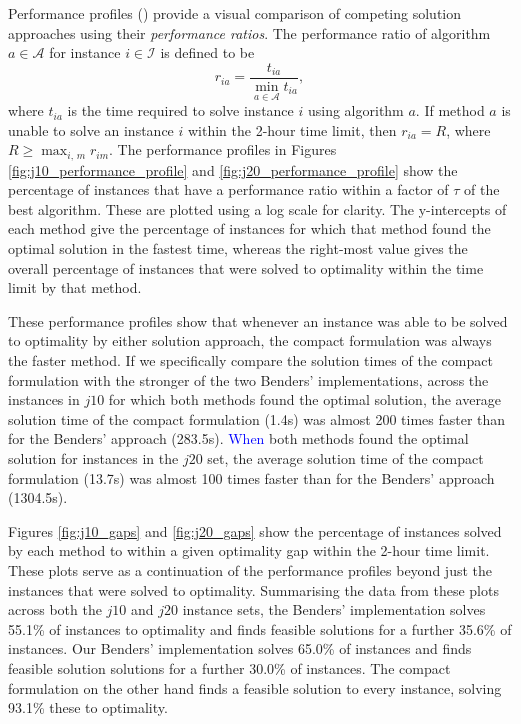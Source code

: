 \documentclass[a4paper,abstracton]{scrartcl}
\newcommand{\marc}[1]{\textcolor{blue}{#1}}
\begin{document}
Performance profiles (\cite{dolan2002benchmarking}) provide a visual comparison of competing solution approaches using their \textit{performance ratios}. The performance ratio of algorithm $a\in \mathcal{A}$ for instance $i\in \mathcal{I}$ is defined to be 
$$r_{ia}=\frac{t_{ia}}{\min_{a\in \mathcal{A}} t_{ia}},$$
where $t_{ia}$ is the time required to solve instance $i$ using algorithm $a$. If method $a$ is unable to solve an instance $i$ within the 2-hour time limit, then $r_{ia}=R$, where $R\geq \max_{i,\,m}r_{im}$. The performance profiles in Figures \ref{fig:j10_performance_profile} and \ref{fig:j20_performance_profile} show the percentage of instances that have a performance ratio within a factor of $\tau$ of the best algorithm. These are plotted using a log scale for clarity. The y-intercepts of each method give the percentage of instances for which that method found the optimal solution in the fastest time, whereas the right-most value gives the overall percentage of instances that were solved to optimality within the time limit by that method.

These performance profiles show that whenever an instance was able to be solved to optimality by either solution approach, the compact formulation was always the faster method. If we specifically compare the solution times of the compact formulation with the stronger of the two Benders' implementations, across the instances in $j10$ for which both methods found the optimal solution, the average solution time of the compact formulation (1.4s) was almost 200 times faster than for the Benders' approach (283.5s). 
\marc{When} both methods found the optimal solution for instances in the $j20$ set, the average solution time of the compact formulation (13.7s) was almost 100 times faster than for the Benders' approach (1304.5s). 

Figures \ref{fig:j10_gaps} and \ref{fig:j20_gaps} show the percentage of instances solved by each method to within a given optimality gap within the 2-hour time limit. These plots serve as a continuation of the performance profiles beyond just the instances that were solved to optimality. Summarising the data from these plots across both the $j10$ and $j20$ instance sets, the \cite{balouka2021robust} Benders' implementation solves 55.1\% of instances to optimality and finds feasible solutions for a further 35.6\% of instances. Our Benders' implementation solves 65.0\% of instances and finds feasible solution solutions for a further 30.0\% of instances. The compact formulation on the other hand finds a feasible solution to every instance, solving 93.1\% these to optimality.
\end{document}
